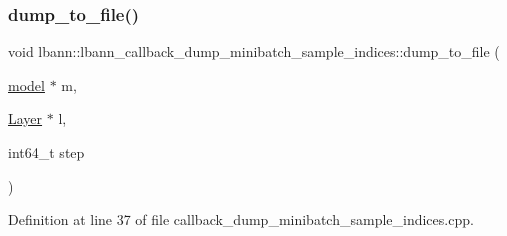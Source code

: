 \subsubsection{\texorpdfstring{dump\+\_\+to\+\_\+file()}{dump\_to\_file()}}
{\footnotesize\ttfamily void lbann\+::lbann\+\_\+callback\+\_\+dump\+\_\+minibatch\+\_\+sample\+\_\+indices\+::dump\+\_\+to\+\_\+file (\begin{DoxyParamCaption}\item[{\hyperlink{classlbann_1_1model}{model} $\ast$}]{m,  }\item[{\hyperlink{classlbann_1_1Layer}{Layer} $\ast$}]{l,  }\item[{int64\+\_\+t}]{step }\end{DoxyParamCaption})}



Definition at line 37 of file callback\+\_\+dump\+\_\+minibatch\+\_\+sample\+\_\+indices.\+cpp.


